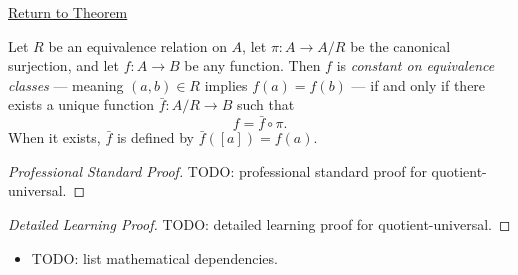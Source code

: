 \newpage
{}
\label{prf:quotient-universal}

\begin{remark*}[Return]
\hyperref[thm:quotient-universal]{Return to Theorem}
\end{remark*}

\begin{theorem*}
Let $R$ be an equivalence relation on $A$, let $\pi : A \to A/R$ be the
canonical surjection, and let $f : A \to B$ be any function. Then $f$ is
\emph{constant on equivalence classes} — meaning $(a,b) \in R$ implies
$f(a) = f(b)$ — if and only if there exists a unique function
$\bar{f} : A/R \to B$ such that
\[
f = \bar{f} \circ \pi.
\]
When it exists, $\bar{f}$ is defined by $\bar{f}([a]) = f(a)$.
\end{theorem*}

\begin{proof}[Professional Standard Proof]
\LRAProofBodyStart
TODO: professional standard proof for quotient-universal.
\end{proof}

\begin{proof}[Detailed Learning Proof]
\LRAProofBodyStart
TODO: detailed learning proof for quotient-universal.
\end{proof}

\begin{remark*}
\end{remark*}

\begin{dependencies}
\begin{itemize}
  \item TODO: list mathematical dependencies.
\end{itemize}
\end{dependencies}

\clearpage
